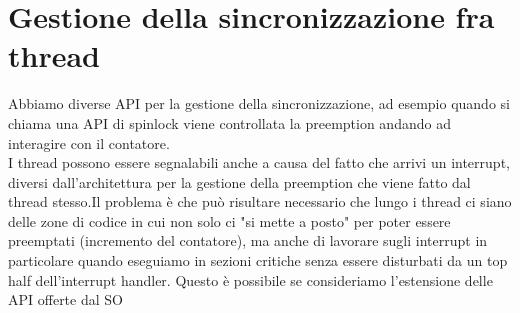 \documentclass[12pt, oneside]{extbook}
\begin{document}
\section{Gestione della sincronizzazione fra thread}
Abbiamo diverse API per la gestione della sincronizzazione, ad esempio quando si chiama una API di spinlock viene controllata la preemption andando ad interagire con il contatore.\\I thread possono essere segnalabili anche a causa del fatto che arrivi un interrupt, diversi dall'architettura per la gestione della preemption che viene fatto dal thread stesso.Il problema è che può risultare necessario che lungo i thread ci siano delle zone di codice in cui non solo ci "si mette a posto" per poter essere preemptati (incremento del contatore), ma anche di lavorare sugli interrupt in particolare quando eseguiamo in sezioni critiche senza essere disturbati da un top half dell'interrupt handler. Questo è possibile se consideriamo l'estensione delle API offerte dal SO
\end{document}
